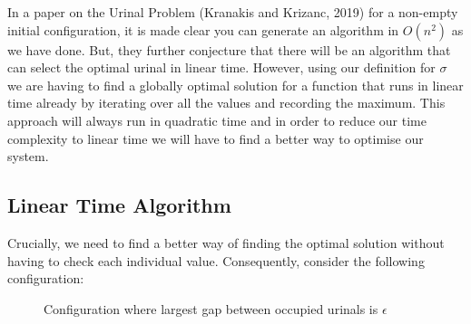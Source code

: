 \documentclass{article}
\begin{document}
In a paper on the Urinal Problem (Kranakis and Krizanc, 2019) for a non-empty initial configuration, it is made clear you can generate an algorithm in $O(n^2)$ as we have done. But, they further conjecture that there will be an algorithm that can select the optimal urinal in linear time. However, using our definition for $\sigma$ we are having to find a globally optimal solution for a function that runs in linear time already by iterating over all the values and recording the maximum. This approach will always run in quadratic time and in order to reduce our time complexity to linear time we will have to find a better way to optimise our system.
 
\subsection{Linear Time Algorithm}
Crucially, we need to find a better way of finding the optimal solution without having to check each individual value. Consequently, consider the following configuration:
\begin{figure}[h]
    \centering
    \caption{Configuration where largest gap between occupied urinals is $\epsilon$} \label{fig:M3}
\end{figure}
\end{document}
